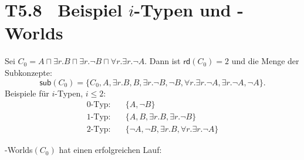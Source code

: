 \documentclass[fontsize=11pt, twoside=false, numbers=autoenddot]{scrbook}
\begin{document}
\section*{{\boldmath T5.8~ Beispiel $i$-Typen und \ALC-Worlds}}

Sei $C_0=A\sqcap \exists r.B\sqcap\exists r.\neg B\sqcap\forall
r.\exists r.\neg A$. Dann ist $\textsf{rd}(C_0)=2$ und die Menge der Subkonzepte: 
%
\[\textsf{sub}(C_0)=\{C_0,A,\exists r.B,B,\exists r.\neg B,\neg B,\forall
r.\exists r.\neg A,\exists r.\neg A,\neg A\}.\]
%
Beispiele für $i$-Typen, $i\leq 2$: 
%
\begin{align*}
  \text{$0$-Typ:} \quad & \{A,\neg B\} \\
  \text{$1$-Typ:} \quad & \{A, B,\exists r.B,\exists r.\neg B\} \\
  \text{$2$-Typ:} \quad & \{\neg A,\neg B,\exists r.B,\forall r.\exists
  r.\neg A\}
\end{align*}

\ALC-Worlds$(C_0)$ hat einen erfolgreichen Lauf: 
\end{document}
